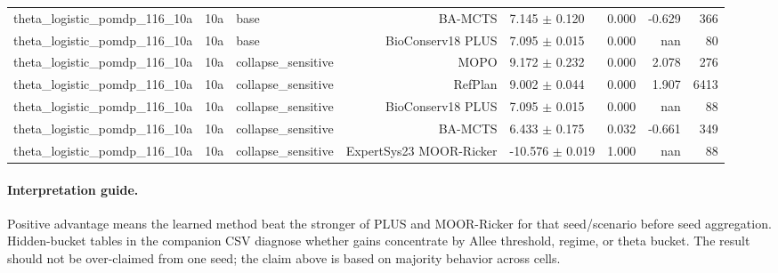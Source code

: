\documentclass{article}
\begin{document}
\begin{longtable}{lllrlrrr}
theta\_logistic\_pomdp\_116\_10a & 10a & base & BA-MCTS & 7.145 $\pm$ 0.120 & 0.000 & -0.629 & 366 \\
theta\_logistic\_pomdp\_116\_10a & 10a & base & BioConserv18 PLUS & 7.095 $\pm$ 0.015 & 0.000 & nan & 80 \\
theta\_logistic\_pomdp\_116\_10a & 10a & collapse\_sensitive & MOPO & 9.172 $\pm$ 0.232 & 0.000 & 2.078 & 276 \\
theta\_logistic\_pomdp\_116\_10a & 10a & collapse\_sensitive & RefPlan & 9.002 $\pm$ 0.044 & 0.000 & 1.907 & 6413 \\
theta\_logistic\_pomdp\_116\_10a & 10a & collapse\_sensitive & BioConserv18 PLUS & 7.095 $\pm$ 0.015 & 0.000 & nan & 88 \\
theta\_logistic\_pomdp\_116\_10a & 10a & collapse\_sensitive & BA-MCTS & 6.433 $\pm$ 0.175 & 0.032 & -0.661 & 349 \\
theta\_logistic\_pomdp\_116\_10a & 10a & collapse\_sensitive & ExpertSys23 MOOR-Ricker & -10.576 $\pm$ 0.019 & 1.000 & nan & 88 \\
\bottomrule
\end{longtable}

\paragraph{Interpretation guide.}
Positive advantage means the learned method beat the stronger of PLUS and
MOOR-Ricker for that seed/scenario before seed aggregation. Hidden-bucket
tables in the companion CSV diagnose whether gains concentrate by Allee
threshold, regime, or theta bucket. The result should not be over-claimed from
one seed; the claim above is based on majority behavior across cells.
\end{document}
